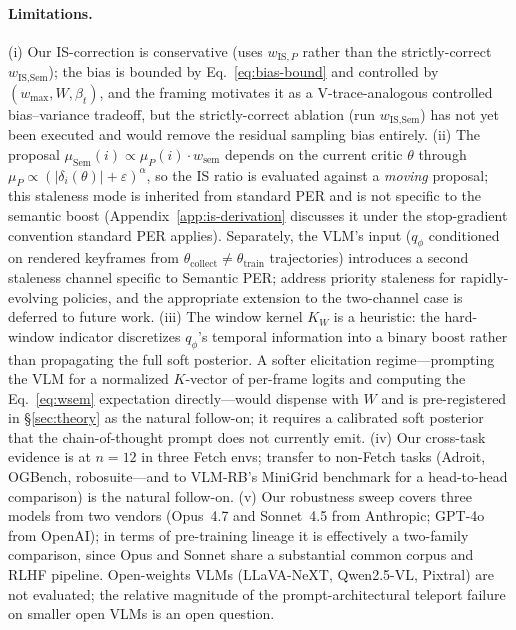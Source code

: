 \documentclass{article}
\begin{document}
\paragraph{Limitations.}
(i) Our IS-correction is conservative (uses $w_{\text{IS},P}$ rather than the
strictly-correct $w_{\text{IS},\text{Sem}}$); the bias is bounded by
Eq.~\eqref{eq:bias-bound} and controlled by $(w_{\max},W,\beta_t)$, and the
framing motivates it as a V-trace-analogous controlled bias--variance tradeoff,
but the strictly-correct ablation (run $w_{\text{IS},\text{Sem}}$) has not yet
been executed and would remove the residual sampling bias entirely.
(ii) The proposal $\mu_{\text{Sem}}(i)\propto\mu_P(i)\cdot w_{\text{sem}}$ depends
on the current critic $\theta$ through $\mu_P\propto(|\delta_i(\theta)|+\varepsilon)^\alpha$,
so the IS ratio is evaluated against a \emph{moving} proposal; this staleness
mode is inherited from standard PER and is not specific to the semantic boost
(Appendix~\ref{app:is-derivation} discusses it under the stop-gradient
convention standard PER applies).
Separately, the VLM's input ($q_\phi$ conditioned on rendered keyframes from
$\theta_{\text{collect}}\!\neq\!\theta_{\text{train}}$ trajectories) introduces
a second staleness channel specific to Semantic PER;
\citet{ma2026freshness} address priority staleness for rapidly-evolving policies,
and the appropriate extension to the two-channel case is deferred to future work.
(iii) The window kernel $K_W$ is a heuristic: the hard-window indicator
discretizes $q_\phi$'s temporal information into a binary boost rather than
propagating the full soft posterior.  A softer elicitation regime---prompting the
VLM for a normalized $K$-vector of per-frame logits and computing the
Eq.~\eqref{eq:wsem} expectation directly---would dispense with $W$ and is
pre-registered in \S\ref{sec:theory} as the natural follow-on; it requires a
calibrated soft posterior that the chain-of-thought prompt does not currently emit.
(iv) Our cross-task evidence is at $n\!=\!12$ in three Fetch envs; transfer to
non-Fetch tasks (Adroit, OGBench, robosuite---and to VLM-RB's MiniGrid
benchmark for a head-to-head comparison) is the natural follow-on.
(v) Our robustness sweep covers three models from two vendors (Opus~4.7 and
Sonnet~4.5 from Anthropic; GPT-4o from OpenAI); in terms of pre-training lineage
it is effectively a two-family comparison, since Opus and Sonnet share a
substantial common corpus and RLHF pipeline.  Open-weights VLMs (LLaVA-NeXT,
Qwen2.5-VL, Pixtral) are not evaluated; the relative magnitude of the
prompt-architectural teleport failure on smaller open VLMs is an open question.
\end{document}
